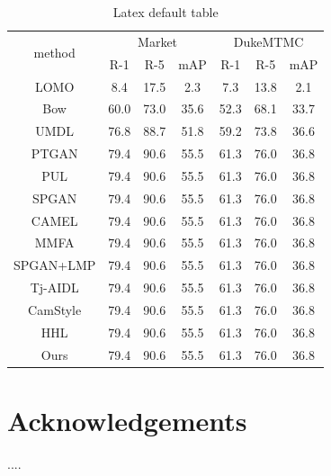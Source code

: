 \documentclass{article}
\begin{document}
\renewcommand\arraystretch{1.5}
\begin{table}
\centering
\begin{tabular}{c|c c c|c c c}
\hline
\multirow{2}{*}{method} & 
\multicolumn{3}{c|}{Market} & \multicolumn{3}{c}{DukeMTMC}\\
\cline{2-7} 
& R-1 & R-5 & mAP & R-1 & R-5 & mAP\\ \hline
\hline
LOMO & 8.4   & 17.5  &  2.3 &  7.3 & 13.8  &  2.1    \\
Bow       & 60.0  & 73.0  & 35.6 & 52.3 & 68.1  & 33.7    \\
UMDL     & 76.8  & 88.7  & 51.8 & 59.2 & 73.8  & 36.6    \\
PTGAN   & 79.4  & 90.6  & 55.5 & 61.3 & 76.0  & 36.8   \\
PUL   & 79.4  & 90.6  & 55.5 & 61.3 & 76.0  & 36.8   \\
SPGAN   & 79.4  & 90.6  & 55.5 & 61.3 & 76.0  & 36.8   \\
CAMEL   & 79.4  & 90.6  & 55.5 & 61.3 & 76.0  & 36.8   \\
MMFA   & 79.4  & 90.6  & 55.5 & 61.3 & 76.0  & 36.8   \\
SPGAN+LMP   & 79.4  & 90.6  & 55.5 & 61.3 & 76.0  & 36.8   \\
Tj-AIDL   & 79.4  & 90.6  & 55.5 & 61.3 & 76.0  & 36.8   \\
CamStyle   & 79.4  & 90.6  & 55.5 & 61.3 & 76.0  & 36.8   \\
HHL   & 79.4  & 90.6  & 55.5 & 61.3 & 76.0  & 36.8   \\
\hline
Ours   & 79.4  & 90.6  & 55.5 & 61.3 & 76.0  & 36.8   \\
\hline
\end{tabular}
\caption{Latex default table}
\label{tab:plain}
\end{table}







\section{Acknowledgements}
....



\end{document}
